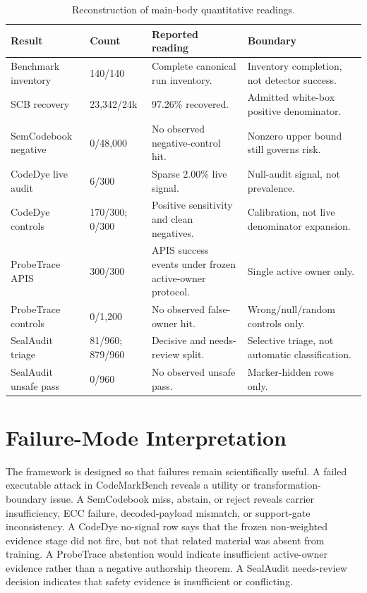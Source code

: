 \begin{table}[htbp]
\centering
\caption{Reconstruction of main-body quantitative readings.}
\label{tab:result-reconstruction-app}
\tighttable
\begin{tabularx}{\textwidth}{@{}L{2.15cm}L{1.95cm}L{2.30cm}Y@{}}
\toprule
Result & Count & Reported reading & Boundary \\
\midrule
Benchmark inventory & 140/140 & Complete canonical run inventory. & Inventory completion, not detector success. \\
SCB recovery & 23,342/24k & 97.26\% recovered. & Admitted white-box positive denominator. \\
SemCodebook negative & 0/48,000 & No observed negative-control hit. & Nonzero upper bound still governs risk. \\
CodeDye live audit & 6/300 & Sparse 2.00\% live signal. & Null-audit signal, not prevalence. \\
CodeDye controls & 170/300; 0/300 & Positive sensitivity and clean negatives. & Calibration, not live denominator expansion. \\
ProbeTrace APIS & 300/300 & APIS success events under frozen active-owner protocol. & Single active owner only. \\
ProbeTrace controls & 0/1,200 & No observed false-owner hit. & Wrong/null/random controls only. \\
SealAudit triage & 81/960; 879/960 & Decisive and needs-review split. & Selective triage, not automatic classification. \\
SealAudit unsafe pass & 0/960 & No observed unsafe pass. & Marker-hidden rows only. \\
\bottomrule
\end{tabularx}
\end{table}

\section{Failure-Mode Interpretation}

The framework is designed so that failures remain scientifically useful. A failed executable attack in CodeMarkBench reveals a utility or transformation-boundary issue. A SemCodebook miss, abstain, or reject reveals carrier insufficiency, ECC failure, decoded-payload mismatch, or support-gate inconsistency. A CodeDye no-signal row says that the frozen non-weighted evidence stage did not fire, but not that related material was absent from training. A ProbeTrace abstention would indicate insufficient active-owner evidence rather than a negative authorship theorem. A SealAudit needs-review decision indicates that safety evidence is insufficient or conflicting.

